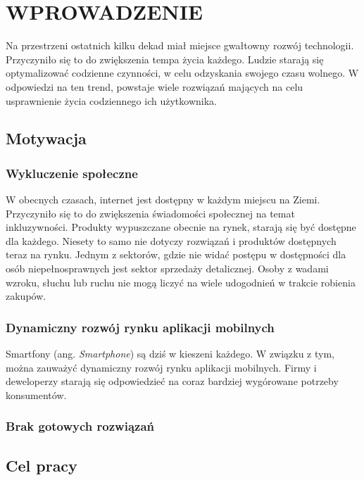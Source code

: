 \chapter{WPROWADZENIE}
\label{chap:introduction}

Na przestrzeni ostatnich kilku dekad miał miejsce gwałtowny rozwój technologii. Przyczyniło się to do zwiększenia tempa życia każdego. Ludzie starają się optymalizować codzienne czynności, w celu odzyskania swojego czasu wolnego. W odpowiedzi na ten trend, powstaje wiele rozwiązań mających na celu usprawnienie życia codziennego ich użytkownika. 

\section{Motywacja}

\subsection{Wykluczenie społeczne}

W obecnych czasach, internet jest dostępny w każdym miejscu na Ziemi. Przyczyniło się to do zwiększenia świadomości społecznej na temat inkluzywności. Produkty wypuszczane obecnie na rynek, starają się być dostępne dla każdego. Niesety to samo nie dotyczy rozwiązań i produktów dostępnych teraz na rynku. Jednym z sektorów, gdzie nie widać postępu w dostępności dla osób niepełnosprawnych jest sektor sprzedaży detalicznej. Osoby z wadami wzroku, słuchu lub ruchu nie mogą liczyć na wiele udogodnień w trakcie robienia zakupów.

\subsection{Dynamiczny rozwój rynku aplikacji mobilnych}

Smartfony (ang. \textit{Smartphone}) są dziś w kieszeni każdego. W związku z tym, można zauważyć dynamiczny rozwój rynku aplikacji mobilnych. Firmy i deweloperzy starają się odpowiedzieć na coraz bardziej wygórowane potrzeby konsumentów.

\subsection{Brak gotowych rozwiązań}

\section{Cel pracy}

